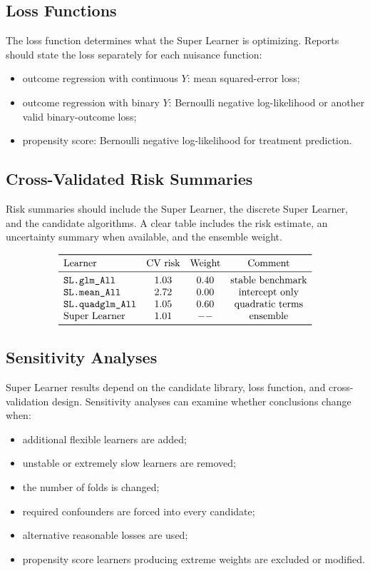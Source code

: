 \subsection{Loss Functions}

The loss function determines what the Super Learner is optimizing. Reports should
state the loss separately for each nuisance function:
\begin{itemize}
\item outcome regression with continuous $Y$: mean squared-error loss;
\item outcome regression with binary $Y$: Bernoulli negative log-likelihood or
another valid binary-outcome loss;
\item propensity score: Bernoulli negative log-likelihood for treatment prediction.
\end{itemize}

\subsection{Cross-Validated Risk Summaries}

Risk summaries should include the Super Learner, the discrete Super Learner, and the
candidate algorithms. A clear table includes the risk estimate, an uncertainty summary
when available, and the ensemble weight.

\[
\begin{array}{lccc}
\toprule
\text{Learner} & \text{CV risk} & \text{Weight} & \text{Comment}\\
\midrule
\texttt{SL.glm\_All} & 1.03 & 0.40 & \text{stable benchmark}\\
\texttt{SL.mean\_All} & 2.72 & 0.00 & \text{intercept only}\\
\texttt{SL.quadglm\_All} & 1.05 & 0.60 & \text{quadratic terms}\\
\text{Super Learner} & 1.01 & -- & \text{ensemble}\\
\bottomrule
\end{array}
\]

\subsection{Sensitivity Analyses}

Super Learner results depend on the candidate library, loss function, and
cross-validation design. Sensitivity analyses can examine whether conclusions change
when:
\begin{itemize}
\item additional flexible learners are added;
\item unstable or extremely slow learners are removed;
\item the number of folds is changed;
\item required confounders are forced into every candidate;
\item alternative reasonable losses are used;
\item propensity score learners producing extreme weights are excluded or modified.
\end{itemize}

